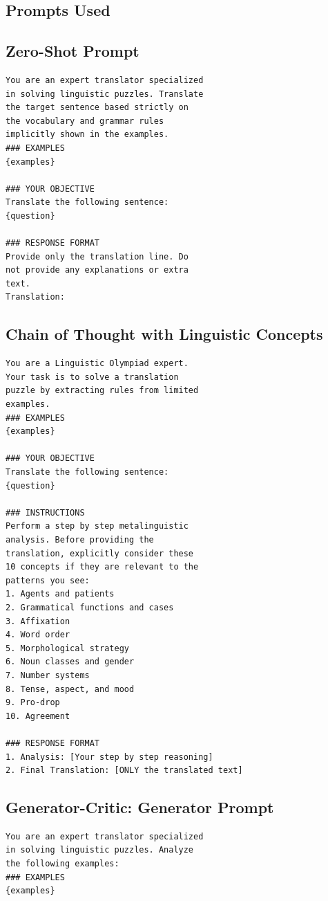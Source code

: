 \documentclass[
	a4paper, %
	10pt, %
	unnumberedsections, %
	twoside, %
]{LTJournalArticle}
\begin{document}
\begin{appendices}

\section{Prompts Used}\label{app:prompts}

\subsection{Zero-Shot Prompt}
\begin{lstlisting}[breaklines=true, basicstyle=\ttfamily\small, frame=single]
You are an expert translator specialized
in solving linguistic puzzles. Translate 
the target sentence based strictly on 
the vocabulary and grammar rules 
implicitly shown in the examples.
### EXAMPLES
{examples}

### YOUR OBJECTIVE
Translate the following sentence: 
{question}

### RESPONSE FORMAT
Provide only the translation line. Do 
not provide any explanations or extra 
text.
Translation:
\end{lstlisting}

\subsection{Chain of Thought with Linguistic Concepts}
\begin{lstlisting}[breaklines=true, basicstyle=\ttfamily\small, frame=single]
You are a Linguistic Olympiad expert. 
Your task is to solve a translation 
puzzle by extracting rules from limited 
examples.
### EXAMPLES
{examples}

### YOUR OBJECTIVE
Translate the following sentence: 
{question}

### INSTRUCTIONS
Perform a step by step metalinguistic
analysis. Before providing the
translation, explicitly consider these
10 concepts if they are relevant to the
patterns you see:
1. Agents and patients
2. Grammatical functions and cases
3. Affixation
4. Word order
5. Morphological strategy
6. Noun classes and gender
7. Number systems
8. Tense, aspect, and mood
9. Pro-drop
10. Agreement

### RESPONSE FORMAT
1. Analysis: [Your step by step reasoning]
2. Final Translation: [ONLY the translated text]
\end{lstlisting}

\subsection{Generator-Critic: Generator Prompt}
\begin{lstlisting}[breaklines=true, basicstyle=\ttfamily\small, frame=single]
You are an expert translator specialized 
in solving linguistic puzzles. Analyze 
the following examples:
### EXAMPLES
{examples}


\end{lstlisting}
\end{appendices}
\end{document}
